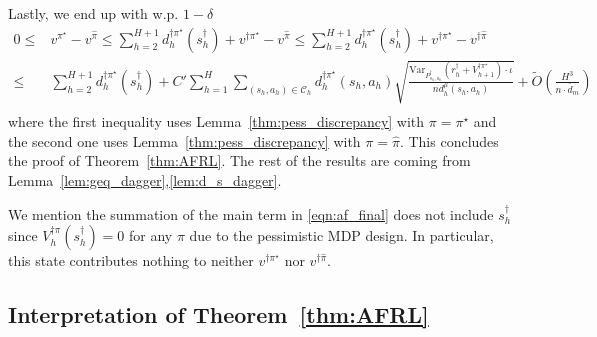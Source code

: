 Lastly, we end up with w.p. $1-\delta$
\begin{equation}\label{eqn:af_final}
\begin{aligned}
0\leq &v^{\pi^\star}-v^{\widehat{\pi}}\leq \sum_{h=2}^{H+1} d^{\dagger\pi^\star}_h(s^\dagger_h)+ v^{\dagger\pi^\star} -v^{\widehat{\pi}}\leq\sum_{h=2}^{H+1} d^{\dagger\pi^\star}_h(s^\dagger_h)+ v^{\dagger\pi^\star} -v^{\dagger\widehat{\pi}} \\
\leq&\sum_{h=2}^{H+1} d^{\dagger\pi^\star}_h(s^\dagger_h)+C'\sum_{h=1}^H\sum_{(s_h,a_h)\in\mathcal{C}_h}d^{\dagger\pi^\star}_h(s_h,a_h)\sqrt{\frac{\mathrm{Var}_{{P}^\dagger_{s_h,a_h}}({r}^\dagger_h+{V}^{\dagger\pi^\star}_{h+1})\cdot\iota}{nd^\mu_h(s_h,a_h)}}+\widetilde{O}(\frac{H^3}{n\cdot\bar{d}_m})\\
\end{aligned}
\end{equation}
where the first inequality uses Lemma~\ref{thm:pess_discrepancy} with $\pi=\pi^\star$ and the second one uses Lemma~\ref{thm:pess_discrepancy} with $\pi=\widehat{\pi}$. This concludes the proof of Theorem~\ref{thm:AFRL}. The rest of the results are coming from Lemma~\ref{lem:geq_dagger},\ref{lem:d_s_dagger}.

\begin{remark}
	We mention the summation of the main term in \eqref{eqn:af_final} does not include $s_h^\dagger$ since $V^{\dagger\pi}_{h}(s^\dagger_h)=0$ for any $\pi$ due to the pessimistic MDP design. In particular, this state contributes nothing to neither $v^{\dagger\pi^\star}$ nor $v^{\dagger\widehat{\pi}}$.
\end{remark}


\subsection{Interpretation of Theorem~\ref{thm:AFRL}}\label{sec:inter} 

